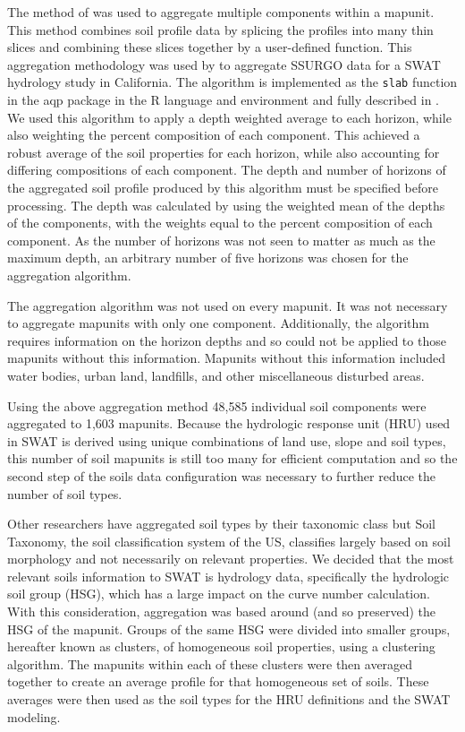 The method of \citet{beaudette_aqp_2013} was used to aggregate multiple components within a mapunit. This method combines soil profile data by splicing the profiles into many thin slices and combining these slices together by a user-defined function. This aggregation methodology was used by \citet{gatzke_soilaggregation_2011} to aggregate SSURGO data for a SWAT hydrology study in California. The algorithm is implemented as the \texttt{slab} function in the aqp package in the R language and environment and fully described in \citet{beaudette_aqp_2013}. We used this algorithm to apply a depth weighted average to each horizon, while also weighting the percent composition of each component. This achieved a robust average of the soil properties for each horizon, while also accounting for differing compositions of each component. The depth and number of horizons of the aggregated soil profile produced by this algorithm must be specified before processing. The depth was calculated by using the weighted mean of the depths of the components, with the weights equal to the percent composition of each component. As the number of horizons was not seen to matter as much as the maximum depth, an arbitrary number of five horizons was chosen for the aggregation algorithm. 

The aggregation algorithm was not used on every mapunit. It was not necessary to aggregate mapunits with only one component. Additionally, the algorithm requires information on the horizon depths and so could not be applied to those mapunits without this information. Mapunits without this information included water bodies, urban land, landfills, and other miscellaneous disturbed areas. 

Using the above aggregation method 48,585 individual soil components were aggregated to 1,603 mapunits. Because the hydrologic response unit (HRU) used in SWAT	is derived using unique combinations of land use, slope and soil types, this number of soil mapunits is still too many for efficient computation  and so the second step of the soils data configuration was necessary to further reduce the number of soil types. %

Other researchers have aggregated soil types by their taxonomic class \citep{gatzke_soilaggregation_2011} but Soil Taxonomy, the soil classification system of the US, classifies largely based on soil morphology and not necessarily on relevant properties. We decided that the most relevant soils information to SWAT is hydrology data, specifically the hydrologic soil group (HSG), which has a large impact on the curve number calculation. With this consideration, aggregation was based around (and so preserved) the HSG of the mapunit. Groups of the same HSG were divided into smaller groups, hereafter known as clusters, of homogeneous soil properties, using a clustering algorithm. The mapunits within each of these clusters were then averaged together to create an average profile for that homogeneous set of soils. These averages were then used as the soil types for the HRU definitions and the SWAT modeling.

